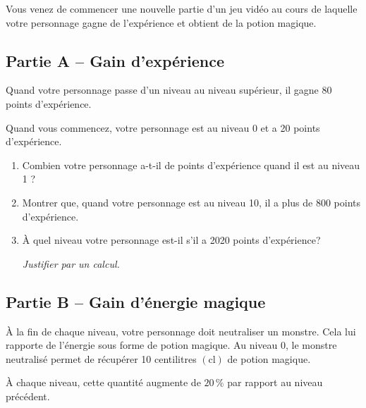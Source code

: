 Vous venez de commencer une nouvelle partie d'un jeu vidéo au cours de laquelle votre personnage gagne de l'expérience et obtient de la potion magique.

\subsection*{Partie A -- Gain d'expérience}
	Quand votre personnage passe d'un niveau au niveau supérieur, il gagne 80 points d'expérience.

	Quand vous commencez, votre personnage est au niveau 0 et a 20 points d'expérience.

	\begin{enumerate}
		\item Combien votre personnage a-t-il de points d'expérience quand il est au niveau 1 ?

		\item Montrer que, quand votre personnage est au niveau 10, il a plus de 800 points d'expérience.

		\item À quel niveau votre personnage est-il s'il a 2020 points d'expérience?

		\emph{Justifier par un calcul.}
	\end{enumerate}



\subsection*{Partie B -- Gain d'énergie magique}
	À la fin de chaque niveau, votre personnage doit neutraliser un monstre. Cela lui rapporte de l'énergie sous forme de potion magique. Au niveau 0, le monstre neutralisé permet de récupérer 10 centilitres $(\mathrm{cl})$ de potion magique.

	À chaque niveau, cette quantité augmente de $20\,\%$ par rapport au niveau précédent.

	\medskip

